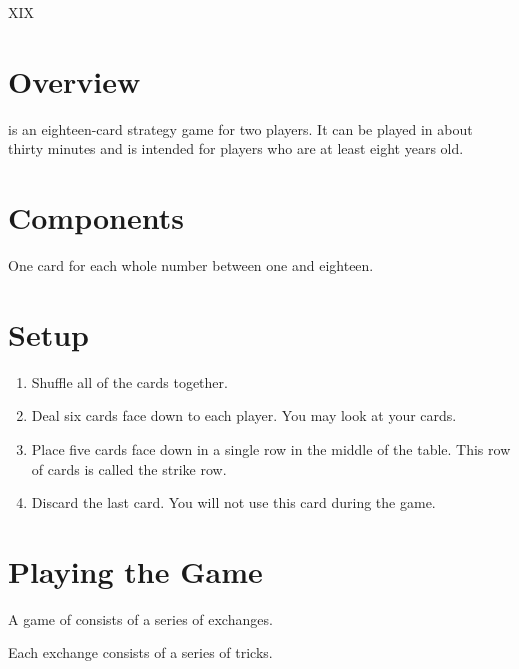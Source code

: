 \documentclass[a6paper, parskip=half, DIV=14, 10pt]{scrartcl}
\newcommand{\textRN}[1]{{\setmainfont{Roboto Slab} \RomanNumeral{#1}}}
\begin{document}
{%
\setmainfont[Scale=5.0]{Roboto Slab}
\Huge
\phantom{a}
\vfill{}
\begin{center}
XIX
\vfill
\phantom{a}
\end{center}
}%
\newpage
\setmainfont{Roboto}%
\raggedright%
\section*{Overview}
\textRN{19} is an eighteen-card strategy game for two players. It can be played in about thirty minutes and is intended for players who are at least eight years old.

\section*{Components}
\begin{description}[leftmargin=0pt, labelsep=\widthof{\ }]
	\item[Numbered Cards (18) \textendash] One card for each whole number between one and eighteen.
\end{description}

\section*{Setup}
\begin{enumerate}[leftmargin=*]
	\item Shuffle all of the cards together. 
	\item Deal six cards face down to each player. You may look at your cards.
	\item Place five cards face down in a single row in the middle of the table. This row of cards is called the strike row.
	\item Discard the last card. You will not use this card during the game.
\end{enumerate}

\newpage

\section*{Playing the Game}
A game of \textRN{19} consists of a series of exchanges.

Each exchange consists of a series of tricks.
\end{document}
